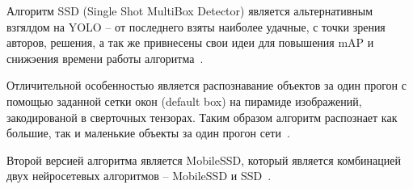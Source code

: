 Алгоритм SSD (Single Shot MultiBox Detector) является альтернативным взгялдом на YOLO -- от последнего взяты наиболее удачные, с точки зрения авторов, решения, а так же привнесены свои идеи для повышения mAP и снижэения времени работы алгоритма~\cite{ssd}.

Отличительной особенностью является распознавание объектов за один прогон с помощью заданной сетки окон (default box) на пирамиде изображений, закодированой в сверточных тензорах. Таким образом алгоритм распознает как большие, так и маленькие объекты за один прогон сети~\cite{ssd}.

Второй версией алгоритма является MobileSSD, который является комбинацией двух нейросетевых алгоритмов -- MobileSSD и SSD~\cite{mobile-ssd}.







